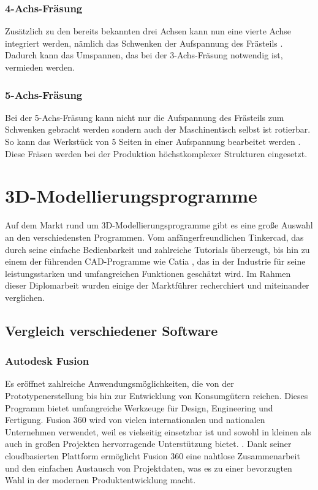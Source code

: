 \subsubsection{4-Achs-Fräsung}
Zusätzlich zu den bereits bekannten drei Achsen kann nun eine vierte Achse integriert werden, nämlich das Schwenken der Aufspannung des Frästeils \parencite{Fraesen345Achs}. Dadurch kann das Umspannen, das bei der 3-Achs-Fräsung notwendig ist, vermieden werden.

\subsubsection{5-Achs-Fräsung}
Bei der 5-Achs-Fräsung kann nicht nur die Aufspannung des Frästeils zum Schwenken gebracht werden sondern auch der Maschinentisch selbst ist rotierbar. So kann das Werkstück von 5 Seiten in einer Aufspannung bearbeitet werden \parencite{Fraesen345Achs}. Diese Fräsen werden bei der Produktion höchstkomplexer Strukturen eingesetzt.\\

\newpage

\section{3D-Modellierungsprogramme}
Auf dem Markt rund um 3D-Modellierungsprogramme gibt es eine große Auswahl an den verschiedensten Programmen. Vom anfängerfreundlichen Tinkercad, das durch seine einfache Bedienbarkeit und zahlreiche Tutorials überzeugt, bis hin zu einem der führenden CAD-Programme wie Catia  \parencite{3DPrintingSoftware}, das in der Industrie für seine leistungsstarken und umfangreichen Funktionen geschätzt wird. \parencite{CADProgramme} Im Rahmen dieser Diplomarbeit wurden einige der Marktführer recherchiert und miteinander verglichen. \\


\subsection{Vergleich verschiedener Software}

\subsubsection{Autodesk Fusion}
Es eröffnet zahlreiche Anwendungsmöglichkeiten, die von der Prototypenerstellung bis hin zur Entwicklung von Konsumgütern reichen. Dieses Programm bietet umfangreiche Werkzeuge für Design, Engineering und Fertigung.  Fusion 360 wird von vielen internationalen und nationalen Unternehmen verwendet, weil es vielseitig einsetzbar ist und sowohl in kleinen als auch in großen Projekten hervorragende Unterstützung bietet. \parencite{AutodeskFusion}. Dank seiner cloudbasierten Plattform ermöglicht Fusion 360 eine nahtlose Zusammenarbeit und den einfachen Austausch von Projektdaten, was es zu einer bevorzugten Wahl in der modernen Produktentwicklung macht. \\

